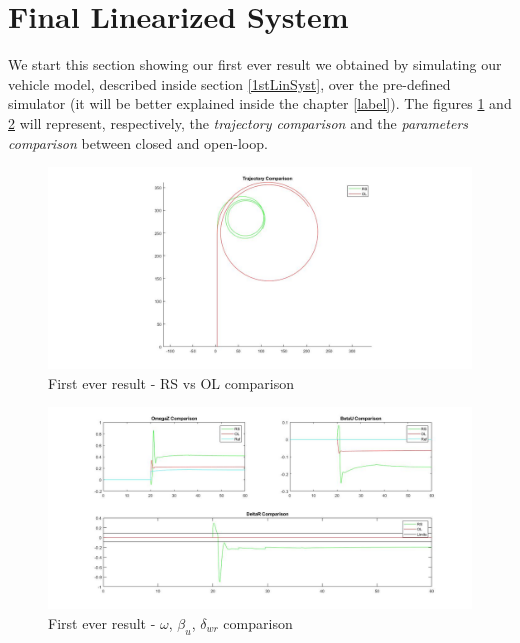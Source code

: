 \section{Final Linearized System} \label{Final LTI}
	We start this section showing our first ever result we obtained by simulating our vehicle model, described inside section \ref{1stLinSyst}, over the pre-defined simulator (it will be better explained inside the chapter \ref{label}). 
	The figures \ref{FR traj} and \ref{FR ref} will represent, respectively, the \textit{trajectory comparison} and the \textit{parameters comparison} between closed and open-loop.
\begin{figure}[!b]
	\centering
	\includegraphics[scale=0.4]{../Images/LinSyst/FakeRes-trj}
	\caption{First ever result - RS vs OL comparison}
	\label{FR traj}
\end{figure}
\begin{figure}
	\centering
	\includegraphics[scale=0.38]{../Images/LinSyst/FakeRes}
	\caption{First ever result - $\omega$, $\beta_{u}$, $\delta_{wr}$ comparison}
	\label{FR ref}
\end{figure}
	
